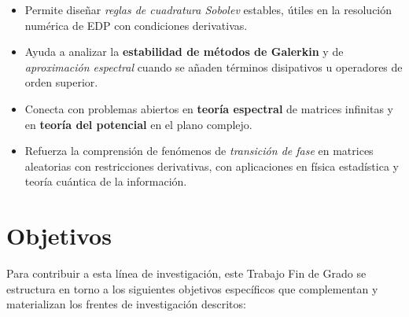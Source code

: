 \begin{itemize}
  \item Permite diseñar \emph{reglas de cuadratura Sobolev} estables, útiles en la resolución numérica de EDP con condiciones derivativas.
  \item Ayuda a analizar la \textbf{estabilidad de métodos de Galerkin} y de \emph{aproximación espectral} cuando se añaden términos disipativos u operadores de orden superior.
  \item Conecta con problemas abiertos en \textbf{teoría espectral} de matrices infinitas y en \textbf{teoría del potencial} en el plano complejo.
  \item Refuerza la comprensión de fenómenos de \emph{transición de fase} en matrices aleatorias con restricciones derivativas, con aplicaciones en física estadística y teoría cuántica de la información.
\end{itemize}

\section{Objetivos}

Para contribuir a esta línea de investigación, este Trabajo Fin de Grado se estructura en torno a los siguientes objetivos específicos que complementan y materializan los frentes de investigación descritos:

